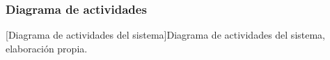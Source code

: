 \subsubsection{Diagrama de actividades} 
\begin{center}
    [Diagrama de actividades del sistema]{Diagrama de actividades del sistema, elaboración propia.}
\end{center}


